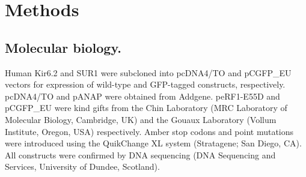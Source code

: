 \chapter{\label{ch:2-methods}Methods}

\graphicspath{{figures/ch2/}}

\minitoc 

\section{Molecular biology.}
Human Kir6.2 and SUR1 were subcloned into pcDNA4/TO and pCGFP\_EU vectors for expression of wild-type and GFP-tagged constructs, respectively.
pcDNA4/TO and pANAP were obtained from Addgene.
peRF1-E55D and pCGFP\_EU were kind gifts from the Chin Laboratory (MRC Laboratory of Molecular Biology, Cambridge, UK) and the Gouaux Laboratory (Vollum Institute, Oregon, USA) respectively.
Amber stop codons and point mutations were introduced using the QuikChange XL system (Stratagene; San Diego, CA).
All constructs were confirmed by DNA sequencing (DNA Sequencing and Services, University of Dundee, Scotland).

